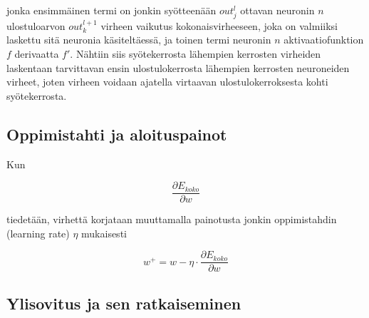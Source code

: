 \documentclass[finnish]{tktltiki2}
\theoremstyle{definition}
\theoremstyle{remark}
\begin{document}
    \noindent jonka ensimmäinen termi on jonkin syötteenään $out_j^l$ ottavan neuronin $n$ ulostuloarvon $out_k^{l+1}$ virheen vaikutus kokonaisvirheeseen, joka on valmiiksi laskettu sitä neuronia käsiteltäessä, ja toinen termi neuronin $n$ aktivaatiofunktion $f$ derivaatta $f'$. Nähtiin siis syötekerrosta lähempien kerrosten virheiden laskentaan tarvittavan ensin ulostulokerrosta lähempien kerrosten neuroneiden virheet, joten virheen voidaan ajatella virtaavan ulostulokerroksesta kohti syötekerrosta.




  \subsection{Oppimistahti ja aloituspainot}
  Kun 

  $$\frac{\partial E_{koko}}{\partial w}$$
  
  tiedetään, virhettä korjataan muuttamalla painotusta jonkin oppimistahdin (learning rate) $\eta$ mukaisesti

  $$ w^+ = w - \eta \cdot \frac{\partial E_{koko}}{\partial w} $$

  \subsection{Ylisovitus ja sen ratkaiseminen}
\end{document}
